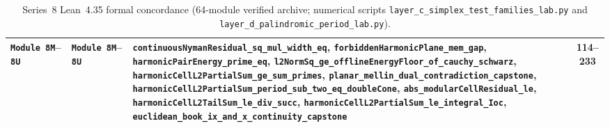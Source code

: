 \documentclass[10pt,a4paper]{article}
\theoremstyle{definition}
\begin{document}
\begin{table}[ht]
\begin{tabular}{@{}l>{\raggedright\arraybackslash}p{4.9cm}>{\raggedright\arraybackslash}p{7.1cm}c@{}}
\texttt{Module~8M}--\texttt{8U} & \texttt{Module~8M}--\texttt{8U} & \texttt{continuousNymanResidual\_\allowbreak sq\_\allowbreak mul\_\allowbreak width\_\allowbreak eq}, \texttt{forbiddenHarmonicPlane\_\allowbreak mem\_\allowbreak gap}, \texttt{harmonicPairEnergy\_\allowbreak prime\_\allowbreak eq}, \texttt{l2NormSq\_\allowbreak ge\_\allowbreak offlineEnergyFloor\_\allowbreak of\_\allowbreak cauchy\_\allowbreak schwarz}, \texttt{harmonicCellL2PartialSum\_\allowbreak ge\_\allowbreak sum\_\allowbreak primes}, \texttt{planar\_\allowbreak mellin\_\allowbreak dual\_\allowbreak contradiction\_\allowbreak capstone}, \texttt{harmonicCellL2PartialSum\_\allowbreak period\_\allowbreak sub\_\allowbreak two\_\allowbreak eq\_\allowbreak doubleCone}, \texttt{abs\_\allowbreak modularCellResidual\_\allowbreak le}, \texttt{harmonicCellL2TailSum\_\allowbreak le\_\allowbreak div\_\allowbreak succ}, \texttt{harmonicCellL2PartialSum\_\allowbreak le\_\allowbreak integral\_\allowbreak Ioc}, \texttt{euclidean\_\allowbreak book\_\allowbreak ix\_\allowbreak and\_\allowbreak x\_\allowbreak continuity\_\allowbreak capstone} & 114--233 \\
\bottomrule
\end{tabular}
\caption{Series~8 Lean~4.35 formal concordance (64-module verified archive; numerical scripts \texttt{layer\_c\_\allowbreak simplex\_\allowbreak test\_\allowbreak families\_\allowbreak lab.py} and \texttt{layer\_d\_\allowbreak palindromic\_\allowbreak period\_\allowbreak lab.py}).}
\label{tab:series8_concordance}
\end{table}
\end{document}
